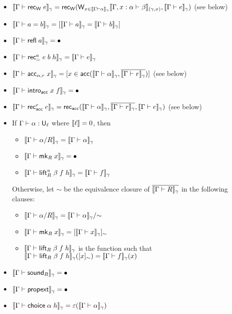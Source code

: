 \begin{itemize}
\item $\scott{\Gamma\vdash\rec_\W\;e}_\gamma=\rec_\W(\W_{x\in\scott{\Gamma\vdash\alpha}_\gamma}\scott{\Gamma,x:\alpha\vdash\beta}_{(\gamma,x)},\scott{\Gamma\vdash e}_\gamma)$ (see below)
\item $\scott{\Gamma\vdash a=b}_\gamma=[\scott{\Gamma\vdash a}_\gamma=\scott{\Gamma\vdash b}_\gamma]$
\item $\scott{\Gamma\vdash \refl\;a}_\gamma=\bullet$
\item $\scott{\Gamma\vdash\rec_=^a\;e\;b\;h}_\gamma=\scott{\Gamma\vdash e}_\gamma$
\item $\scott{\Gamma\vdash\acc_{\alpha,r}\;x}_\gamma=[x\in\acc(\scott{\Gamma\vdash \alpha}_\gamma,\overline{\scott{\Gamma\vdash r}_\gamma})]$ (see below)
\item $\scott{\Gamma\vdash\intro_\acc\;x\;f}_\gamma=\bullet$
\item $\scott{\Gamma\vdash\rec_\acc^r\;e}_\gamma=\rec_\acc(\scott{\Gamma\vdash\alpha}_\gamma,\overline{\scott{\Gamma\vdash r}_\gamma},\scott{\Gamma\vdash e}_\gamma)$ (see below)
\item If $\Gamma\vdash\alpha:\U_\ell$ where $\llbracket \ell\rrbracket=0$, then
\begin{itemize}
\item $\scott{\Gamma\vdash\alpha/R}_\gamma=\scott{\Gamma\vdash\alpha}_\gamma$
\item $\scott{\Gamma\vdash\mk_R\;x}_\gamma=\bullet$
\item $\scott{\Gamma\vdash\lift^u_R\;\beta\;f\;h}_\gamma=\scott{\Gamma\vdash f}_\gamma$
\end{itemize}
Otherwise, let $\sim$ be the equivalence closure of $\overline{\scott{\Gamma\vdash R}_\gamma}$ in the following clauses:
\begin{itemize}
\item $\scott{\Gamma\vdash\alpha/R}_\gamma=\scott{\Gamma\vdash\alpha}_\gamma/{\sim}$
\item $\scott{\Gamma\vdash\mk_R\;x}_\gamma=[\scott{\Gamma\vdash x}_\gamma]_\sim$
\item $\scott{\Gamma\vdash\lift_R\;\beta\;f\;h}_\gamma$ is the function such that $\scott{\Gamma\vdash\lift_R\;\beta\;f\;h}_\gamma([x]_\sim)=\scott{\Gamma\vdash f}_\gamma(x)$
\end{itemize}
\item $\scott{\Gamma\vdash\sound_R}_\gamma=\bullet$
\item $\scott{\Gamma\vdash\mathsf{propext}}_\gamma=\bullet$
\item $\scott{\Gamma\vdash\mathsf{choice}\;\alpha\;h}_\gamma=\vep(\scott{\Gamma\vdash\alpha}_\gamma)$
\end{itemize}

